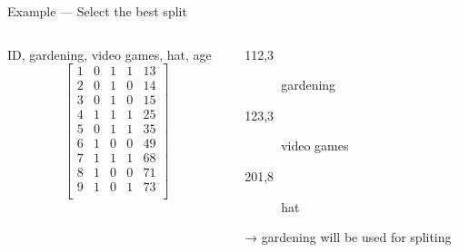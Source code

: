 \begin{frame}{Example — Select the best split}
  \begin{columns}
    \begin{column}{.5\textwidth}
      ID, gardening, video games, hat, age
      \[
        \begin{bmatrix}
          1 & 0 & 1 & 1 & 13  \\
          2 & 0 & 1 & 0 & 14 \\
          3 & 0 & 1 & 0 & 15 \\
          4 & 1 & 1 & 1 & 25 \\
          5 & 0 & 1 & 1 & 35 \\
          6 & 1 & 0 & 0 & 49 \\
          7 & 1 & 1 & 1 & 68 \\
          8 & 1 & 0 & 0 & 71 \\
          9 & 1 & 0 & 1 & 73 \\
        \end{bmatrix}
      \]
    \end{column}
    \begin{column}{.5\textwidth}
      \begin{description}
        \item[112,3] gardening
        \item[123,3] video games
        \item[201,8] hat
      \end{description}
      → gardening will be used for spliting
    \end{column}
  \end{columns}
\end{frame}

